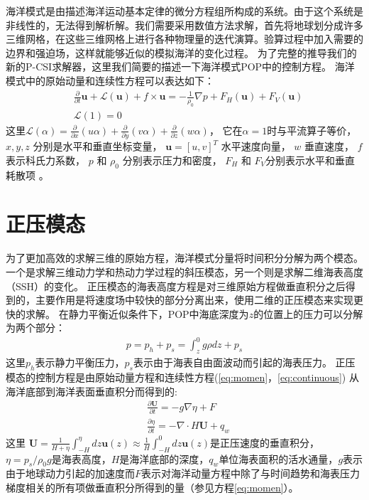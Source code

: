 海洋模式是由描述海洋运动基本定律的微分方程组所构成的系统。由于这个系统是非线性的，无法得到解析解。我们需要采用数值方法求解，首先将地球划分成许多三维网格，在这些三维网格上进行各种物理量的迭代演算。验算过程中加入需要的边界和强迫场，这样就能够近似的模拟海洋的变化过程。
为了完整的推导我们的新的P-CSI求解器，这里我们简要的描述一下海洋模式POP中的控制方程。
海洋模式中的原始动量和连续性方程可以表达如下：
\begin{align}
&\frac{\partial }{\partial t} \textbf{u} +\mathcal{L}(\textbf{u}) + f\times \textbf{u} = - \frac{1}{\rho_0}\nabla p +F_H(\textbf{u}) +F_V(\textbf{u}) \label{eq:momen}\\
&\mathcal{L}(1) = 0 \label{eq:continuous}
\end{align}
这里$\mathcal{L}(\alpha ) = \frac{\partial }{\partial x} (u\alpha)  +\frac{\partial }{\partial y} (v\alpha) +\frac{\partial }{\partial z} (w\alpha)$， 它在$\alpha =1$时与平流算子等价， $x, y, z$ 分别是水平和垂直坐标变量， $\textbf{u} = [u, v]^T$ 水平速度向量， $w$ 垂直速度， $f$ 表示科氏力系数，  $p$ 和 $\rho_0$ 分别表示压力和密度， $F_H$ 和 $F_V$分别表示水平和垂直耗散项 \cite{smith2010parallel}。  


\section{正压模态} \label{solver:mode}

为了更加高效的求解三维的原始方程，海洋模式分量将时间积分分解为两个模态。 一个是求解三维动力学和热动力学过程的斜压模态，另一个则是求解二维海表高度（SSH）的变化。
正压模态的海表高度方程是对三维原始方程做垂直积分之后得到的，主要作用是将速度场中较快的部分分离出来，使用二维的正压模态来实现更快的求解。
在静力平衡近似条件下，POP中海底深度为$z$的位置上的压力可以分解为两个部分：  
\begin{align}
\displaystyle p = p_h + p_s = \int^0_z g\rho dz +p_s
\end{align}
这里$p_h$表示静力平衡压力，$p_s$表示由于海表自由面波动而引起的海表压力。 
正压模态的控制方程是由原始动量方程和连续性方程(\ref{eq:momen}，\ref{eq:continuous}) 从海洋底部到海洋表面垂直积分而得到的:
\begin{align}
&\displaystyle \frac{\partial \textbf{U} }{\partial t}  = -g \nabla \eta + F  \label{eq:baro_mon}\\
&\displaystyle \frac{\partial \eta }{\partial t} = - \nabla \cdot H\textbf{U} + q_w  \label{eq:baro_con}
\end{align}
这里  $\textbf{U} =  \frac{1}{H+\eta}\int_{-H}^\eta dz \textbf{u}(z) \approx \frac{1}{H }\int_{-H}^0 dz \textbf{u}(z)$是正压速度的垂直积分，
$\eta = p_s/{\rho_0g}$是海表高度，$H$是海洋底部的深度，$q_w$单位海表面积的活水通量，$g$表示由于地球动力引起的加速度而$F$表示对海洋动量方程中除了与时间趋势和海表压力梯度相关的所有项做垂直积分所得到的量（参见方程\ref{eq:momen}）。
 
